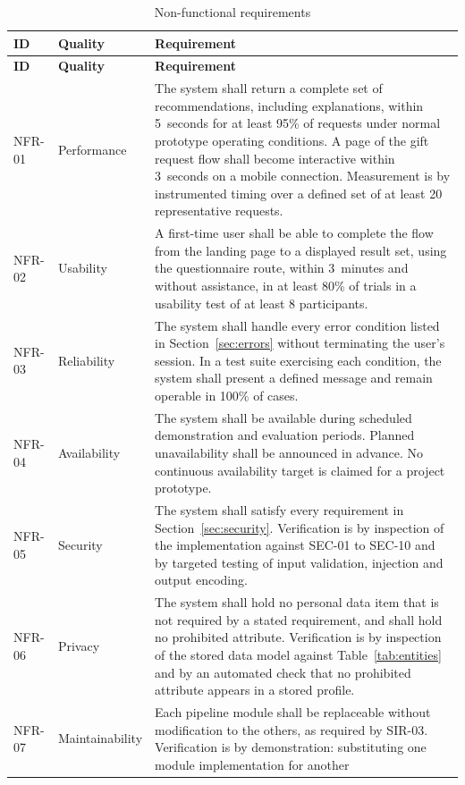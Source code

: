 \documentclass[11pt,a4paper]{report}
\begin{document}
\begin{longtable}{@{}L{1.9cm}L{3.2cm}L{9.4cm}@{}}
\caption{Non-functional requirements}\label{tab:nfr}\\
\toprule
\textbf{ID} & \textbf{Quality} & \textbf{Requirement} \\ \midrule
\endfirsthead
\toprule \textbf{ID} & \textbf{Quality} & \textbf{Requirement} \\ \midrule
\endhead
\bottomrule
\endfoot
NFR-01 & Performance &
The system shall return a complete set of recommendations, including explanations, within
5~seconds for at least 95\% of requests under normal prototype operating conditions. A page
of the gift request flow shall become interactive within 3~seconds on a mobile connection.
Measurement is by instrumented timing over a defined set of at least 20 representative
requests. \\
NFR-02 & Usability &
A first-time user shall be able to complete the flow from the landing page to a displayed
result set, using the questionnaire route, within 3~minutes and without assistance, in at
least 80\% of trials in a usability test of at least 8 participants. \\
NFR-03 & Reliability &
The system shall handle every error condition listed in Section~\ref{sec:errors} without
terminating the user's session. In a test suite exercising each condition, the system shall
present a defined message and remain operable in 100\% of cases. \\
NFR-04 & Availability &
The system shall be available during scheduled demonstration and evaluation periods. Planned
unavailability shall be announced in advance. No continuous availability target is claimed
for a project prototype. \\
NFR-05 & Security &
The system shall satisfy every requirement in Section~\ref{sec:security}. Verification is by
inspection of the implementation against SEC-01 to SEC-10 and by targeted testing of input
validation, injection and output encoding. \\
NFR-06 & Privacy &
The system shall hold no personal data item that is not required by a stated requirement, and
shall hold no prohibited attribute. Verification is by inspection of the stored data model
against Table~\ref{tab:entities} and by an automated check that no prohibited attribute
appears in a stored profile. \\
NFR-07 & Maintainability &
Each pipeline module shall be replaceable without modification to the others, as required by
SIR-03. Verification is by demonstration: substituting one module implementation for another

\end{longtable}
\end{document}
